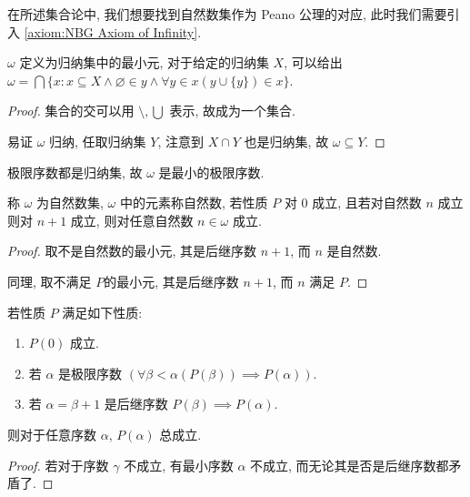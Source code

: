 在所述集合论中, 我们想要找到自然数集作为 Peano 公理的对应, 此时我们需要引入 \ref{axiom:NBG Axiom of Infinity}.

\begin{definition}
    \label{definition:omega}
    \(\omega\) 定义为归纳集中的最小元, 对于给定的归纳集 \(X\), 可以给出 \(\omega = \bigcap \{x : x \subseteq X \land \varnothing \in y \land \forall y \in x (y \cup \{y\}) \in x\}\).

    \begin{proof}
        集合的交可以用 \(\setminus, \bigcup\) 表示, 故成为一个集合.

        易证 \(\omega\) 归纳, 任取归纳集 \(Y\), 注意到 \(X \cap Y\) 也是归纳集, 故 \(\omega \subseteq Y\).
    \end{proof}
\end{definition}

\begin{corollary}
    极限序数都是归纳集, 故 \(\omega\) 是最小的极限序数.
\end{corollary}

\begin{theorem}[数学归纳法]
    \label{theorem:mathematical induction}
    称 \(\omega\) 为自然数集, \(\omega\) 中的元素称自然数, 若性质 \(P\) 对 \(0\) 成立, 且若对自然数 \(n\) 成立则对 \(n+1\) 成立, 则对任意自然数 \(n \in \omega\) 成立.
    
    \begin{proof}
        取不是自然数的最小元, 其是后继序数 \(n+1\), 而 \(n\) 是自然数.

        同理, 取不满足 \(P\)的最小元, 其是后继序数 \(n+1\), 而 \(n\) 满足 \(P\).
    \end{proof}
\end{theorem}

\begin{theorem}[超限归纳法]
    \label{theorem:transfinite induction}
    若性质 \(P\) 满足如下性质:
    \begin{enumerate}
        \item \(P(0)\) 成立.
        \item 若 \(\alpha\) 是极限序数 \((\forall \beta < \alpha (P(\beta)) \implies P(\alpha))\).
        \item 若 \(\alpha = \beta + 1\) 是后继序数 \(P(\beta) \implies P(\alpha)\).
    \end{enumerate}

    则对于任意序数 \(\alpha\), \(P(\alpha)\) 总成立.

    \begin{proof}
        若对于序数 \(\gamma\) 不成立, 有最小序数 \(\alpha\) 不成立, 而无论其是否是后继序数都矛盾了.
    \end{proof}
\end{theorem}

